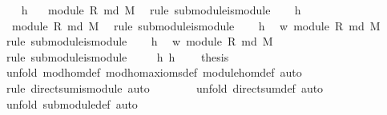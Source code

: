 \begin{isabellebody}
\isanewline
\ \ \isamarkupfalse%
\ h{}\ \isamarkupfalse%
\ {}{\isacharcolon}\ {\isachardoublequoteopen}module\ R\ {\isacharparenleft}md\ M{}{\isacharparenright}{\isachardoublequoteclose}\ \isamarkupfalse%
\ {\isacharparenleft}rule\ submodule{\isacharunderscore}is{\isacharunderscore}module{\isacharparenright}\isanewline
\ \ \isamarkupfalse%
\ h{}\ \isamarkupfalse%
\ {}{\isacharcolon}\ {\isachardoublequoteopen}module\ R\ {\isacharparenleft}md\ M{}{\isacharparenright}{\isachardoublequoteclose}\ \isamarkupfalse%
\ {\isacharparenleft}rule\ submodule{\isacharunderscore}is{\isacharunderscore}module{\isacharparenright}\isanewline
\ \ \isamarkupfalse%
\ h{}\ \isamarkupfalse%
\ w{}{\isacharcolon}\ module\ R\ {\isachardoublequoteopen}{\isacharparenleft}md\ M{}{\isacharparenright}{\isachardoublequoteclose}\ \isamarkupfalse%
\ {\isacharparenleft}rule\ submodule{\isacharunderscore}is{\isacharunderscore}module{\isacharparenright}\isanewline
\ \ \isamarkupfalse%
\ h{}\ \isamarkupfalse%
\ w{}{\isacharcolon}\ module\ R\ {\isachardoublequoteopen}{\isacharparenleft}md\ M{}{\isacharparenright}{\isachardoublequoteclose}\ \isamarkupfalse%
\ {\isacharparenleft}rule\ submodule{\isacharunderscore}is{\isacharunderscore}module{\isacharparenright}\isanewline
\ \ \isamarkupfalse%
\ {}\ h{}\ h{}\ {}\ {}\ \isamarkupfalse%
\ {\isacharquery}thesis\isanewline
\ \ \ \ \isamarkupfalse%
\ {\isacharparenleft}unfold\ mod{\isacharunderscore}hom{\isacharunderscore}def\ mod{\isacharunderscore}hom{\isacharunderscore}axioms{\isacharunderscore}def\ module{\isacharunderscore}hom{\isacharunderscore}def{\isacharcomma}\ auto{\isacharparenright}\isanewline
\ \ \ \ \ \ \ \isamarkupfalse%
\ {\isacharparenleft}rule\ direct{\isacharunderscore}sum{\isacharunderscore}is{\isacharunderscore}module{\isacharcomma}\ auto{\isacharparenright}\isanewline
\ \ \ \ \ \ \isamarkupfalse%
\ {\isacharparenleft}unfold\ direct{\isacharunderscore}sum{\isacharunderscore}def{\isacharcomma}\ auto{\isacharparenright}\isanewline
\ \ \ \ \ \ \isamarkupfalse%
\ {\isacharparenleft}unfold\ submodule{\isacharunderscore}def{\isacharcomma}\ auto{\isacharparenright}\isanewline

\end{isabellebody}
